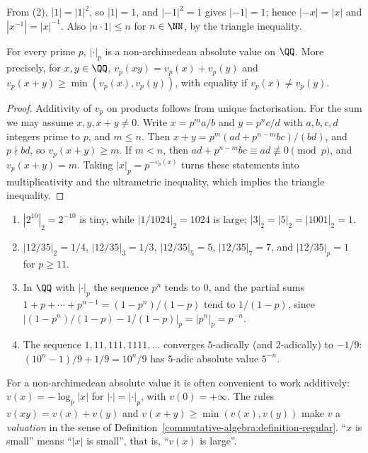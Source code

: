 From (2), $|1| = |1|^2$, so $|1| = 1$, and $|-1|^2 = 1$ gives $|-1| = 1$; hence $|-x| = |x|$ and $|x^{-1}| = |x|^{-1}$. Also $|n \cdot 1| \leq n$ for $n \in \NN$, by the triangle inequality.

\begin{proposition}\label{p-adic-numbers:proposition-p-adic-absolute-value}
For every prime $p$, $|\cdot|_p$ is a non-archimedean absolute value on $\QQ$. More precisely, for $x, y \in \QQ$, $v_p(xy) = v_p(x) + v_p(y)$ and $v_p(x + y) \geq \min(v_p(x), v_p(y))$, with equality if
$v_p(x) \neq v_p(y)$.
\end{proposition}

\begin{proof}
Additivity of $v_p$ on products follows from unique factorisation. For the sum we may assume $x, y, x + y \neq 0$. Write $x = p^ma/b$ and $y = p^nc/d$ with $a, b, c, d$ integers prime to $p$, and
$m \leq n$. Then $x + y = p^m(ad + p^{n-m}bc)/(bd)$, and $p \nmid bd$, so $v_p(x + y) \geq m$. If $m < n$, then $ad + p^{n-m}bc \equiv ad \not\equiv 0 \pmod p$, and $v_p(x + y) = m$. Taking
$|x|_p = p^{-v_p(x)}$ turns these statements into multiplicativity and the ultrametric inequality, which implies the triangle inequality.
\end{proof}

\begin{example}\label{p-adic-numbers:example-p-adic-sizes}
\begin{enumerate}
\item $|2^{10}|_2 = 2^{-10}$ is tiny, while $|1/1024|_2 = 1024$ is large; $|3|_2 = |5|_2 = |1001|_2 = 1$.
\item $|12/35|_2 = 1/4$, $|12/35|_3 = 1/3$, $|12/35|_5 = 5$, $|12/35|_7 = 7$, and $|12/35|_p = 1$ for $p \geq 11$.
\item In $\QQ$ with $|\cdot|_p$ the sequence $p^n$ tends to $0$, and the partial sums $1 + p + \cdots + p^{n-1} = (1 - p^n)/(1 - p)$ tend to $1/(1 - p)$, since
$|(1 - p^n)/(1 - p) - 1/(1 - p)|_p = |p^n|_p = p^{-n}$.
\item The sequence $1, 11, 111, 1111, \ldots$ converges $5$-adically (and $2$-adically) to $-1/9$: $(10^n - 1)/9 + 1/9 = 10^n/9$ has $5$-adic absolute value $5^{-n}$.
\end{enumerate}
\end{example}

\begin{notation}\label{p-adic-numbers:notation-valuation}
For a non-archimedean absolute value it is often convenient to work additively: $v(x) = -\log_p|x|$ for $|\cdot| = |\cdot|_p$, with $v(0) = +\infty$. The rules
$v(xy) = v(x) + v(y)$ and $v(x + y) \geq \min(v(x), v(y))$ make $v$ a \emph{valuation} in the sense of Definition~\ref{commutative-algebra:definition-regular}. ``$x$ is small'' means
``$|x|$ is small'', that is, ``$v(x)$ is large''.
\end{notation}

